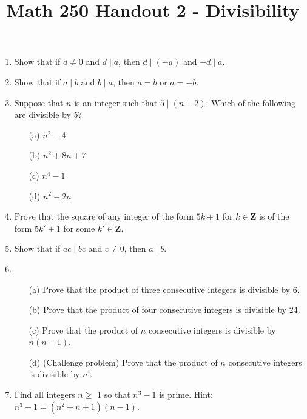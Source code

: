 \documentclass[12pt, reqno]{amsart}
\begin{document}
\title[Math 250 Handout 2 - Divisibility]{Math 250 Handout 2 - Divisibility}\maketitle

\begin{enumerate}

\item Show that if $d \neq 0$ and $d\mid a$, then $d\mid(-a)$ and $-d\mid a$.

\item Show that if $a\mid b$ and $b\mid a$, then $a=b$ or $a=-b$.

\item Suppose that $n$ is an integer such that $5\mid (n + 2)$. Which of the following are divisible by 5? 
 \begin{enumerate}
 \item [(a)] $n^2 -4$
 \item [(b)] $n^2 +8n+7$
 \item [(c)] $n^4 -1$
 \item [(d)] $n^2 - 2n$ \end{enumerate} 
\item Prove that the square of any integer of the form $5k + 1$ for $k \in \mathbf{Z}$ is of the form $5k' + 1$ for some $k' \in \mathbf{Z}$.

\item Show that if $ ac\mid bc$ and $c \neq 0$, then $a\mid b$.

\vspace{15pt}

\item 
  \begin{enumerate}
 \item [(a)] Prove that the product of three consecutive integers is divisible by 6.
 \item [(b)] Prove that the product of four consecutive integers is divisible by 24.
 \item [(c)] Prove that the product of $n$ consecutive integers is divisible by $n(n-1)$.
 \item [(d)] (Challenge problem) Prove that the product of $n$ consecutive integers is divisible by $n!$.
 
 
 \end{enumerate}

\item Find all integers $n \geq$ 1 so that $n^3 -1$ is prime. Hint: $n^3 -1 = (n^2 +n+1)(n-1)$. 


\end{enumerate}
\end{document}
